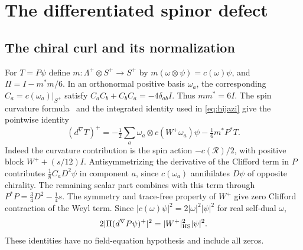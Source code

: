 \documentclass[11pt]{article}
\theoremstyle{remark}
\begin{document}
\section{The differentiated spinor defect}

\subsection{The chiral curl and its normalization}
For \(T=P\psi\) define \(m:\Lambda^+\otimes S^+\to S^+\) by \(m(\omega\otimes\psi)=c(\omega)\psi\), and \(\Pi=I-m^*m/6\). In an orthonormal positive basis \(\omega_a\), the corresponding \(C_a=c(\omega_a)|_{S^+}\) satisfy \(C_a C_b+C_b C_a=-4\delta_{ab}I\). Thus \(mm^*=6I\).
The spin curvature formula~\cite[\S2]{Bar1996SphereDirac} and the integrated identity used in \eqref{eq:hijazi} give the pointwise identity
\begin{equation}
 (d^\nabla T)^+=-\tfrac12\sum_a\omega_a\otimes c(W^+\omega_a)\psi
                             -\tfrac16 m^*P^*T .
 \label{eq:curl}
\end{equation}
Indeed the curvature contribution is the spin action \(-c(\mathcal R)/2\), with positive block \(W^++(s/12)I\). Antisymmetrizing the derivative of the Clifford term in \(P\) contributes \(\tfrac18 C_aD^2\psi\) in component \(a\), since \(c(\omega_a)\) annihilates \(D\psi\) of opposite chirality. The remaining scalar part combines with this term through \(P^*P=\tfrac34 D^2-\tfrac14s\). The symmetry and trace-free property of \(W^+\) give zero Clifford contraction of the Weyl term. Since \(|c(\omega)\psi|^2=2|\omega|^2|\psi|^2\) for real self-dual \(\omega\),
\begin{equation}
  2|\Pi(d^\nabla P\psi)^+|^2=|W^+|_{\rm HS}^2|\psi|^2 .
  \label{eq:curlnorm}
\end{equation}
These identities have no field-equation hypothesis and include all zeros.
\end{document}
